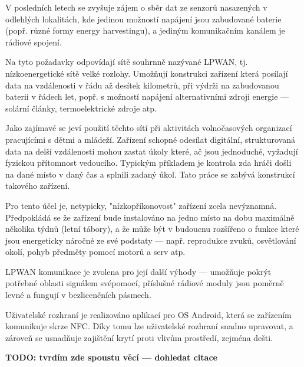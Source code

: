 
V posledních letech se zvyšuje zájem o sběr dat ze senzorů nasazených v odlehlých lokalitách, 
kde jedinou možností napájení jsou zabudované baterie (popř. různé formy energy harvestingu),
a jediným komunikačním kanálem je rádiové spojení.

Na tyto požadavky odpovídají sítě souhrnně nazývané LPWAN, tj. nízkoenergetické sítě velké rozlohy.
Umožňují konstrukci zařízení která posílají data na vzdálenosti v řádu až desítek kilometrů, při výdrži na zabudovanou baterii v řádech let, popř. s možností napájení alternativními zdroji energie --- solární články, termoelektrické zdroje atp.

Jako zajímavé se jeví použití těchto sítí při aktivitách volnočasových organizací pracujícími
s dětmi a mládeží. Zařízení schopné odesílat digitální, strukturovaná data na delší vzdálenosti
mohou zastat úkoly které, ač jsou jednoduché, vyžadují fyzickou přítomnost vedoucího.
Typickým příkladem je kontrola zda hráči došli na dané místo v daný čas a splnili zadaný úkol.
Tato práce se zabývá konstrukcí takového zařízení.

Pro tento účel je, netypicky, "nízkopříkonovost" zařízení zcela nevýznamná. Předpokládá se že zařízení bude instalováno na jedno místo na dobu maximálně několika týdnů (letní tábory), a že může být v budoucnu rozšířeno o funkce které jsou energeticky náročné ze své podstaty --- např. reprodukce zvuků, osvětlování okolí, pohyb předměty pomocí motorů a serv atp.

LPWAN komunikace je zvolena pro její další výhody --- umožňuje pokrýt potřebné oblasti
signálem svépomocí, příslušné rádiové moduly jsou poměrně levné a fungují v bezlicenčních pásmech.

Uživatelské rozhraní je realizováno aplikací pro OS Android, která se zařízením komunikuje skrze NFC.
Díky tomu lze uživatelské rozhraní snadno upravovat, a zároveň se usnadňuje zajištění krytí proti
vlivům prostředí, zejména dešti.


\textbf{TODO: tvrdím zde spoustu věcí --- dohledat citace}




